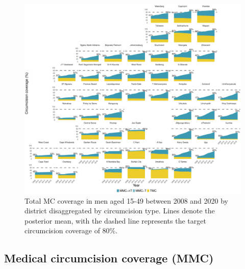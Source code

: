 \documentclass{article}
\begin{document}
\begin{appendix}

\begin{figure}[H]
	\centering
	\includegraphics[width = \linewidth]{Figures/suppmat/Coverage/Coverage_1549_District.pdf}
	\caption{Total MC coverage in men aged 15-49 between 2008 and 2020 by district disaggregated by circumcision type. Lines denote the posterior mean, with the dashed line represents the target circumcision coverage of 80\%.}
\end{figure}


\subsection{Medical circumcision coverage (MMC)}



\end{appendix}
\end{document}
